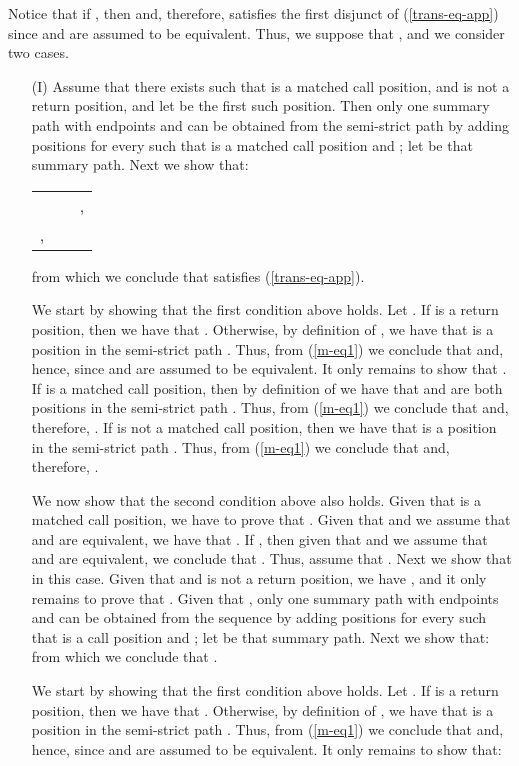 \documentclass{LMCS}
\theoremstyle{plain}
\theoremstyle{definition}
\begin{document}
Notice that if , then  and, therefore,
 satisfies the first disjunct of (\ref{trans-eq-app}) since
 and  are assumed to be equivalent. Thus, we
suppose that , and we consider two cases.
\begin{enumerate}[(a)]
\item[(I)] Assume that there exists  such that 
is a matched call position,  and  is not a
return position, and let  be the first such position. Then only
one summary path with endpoints  and  can be obtained
from the semi-strict path  by adding
positions  for every  such that  is a
matched call position and ; let  be that summary path. Next we show that:
\begin{center}
{\small
\begin{tabular}{l}
 \ \ \ \ \
,\\ 
,
\end{tabular}}
\end{center}
from which we conclude that  satisfies (\ref{trans-eq-app}).

We start by showing that the first condition above holds.  Let . If  is a return position, then we have that . Otherwise, by definition of
, we have that  is a position in the
semi-strict path . Thus, from (\ref{m-eq1}) we
conclude that  and, hence,  since  and  are assumed to
be equivalent. It only remains to show that . If
 is a matched call position, then by definition of  we have
that  and  are both positions in the semi-strict
path . Thus, from (\ref{m-eq1}) we
conclude that  and, therefore, . If  is not a matched call position, then we have
that  is a position in the semi-strict path . Thus, from (\ref{m-eq1}) we conclude that  and, therefore, .  

We now show that the second condition above also holds. Given that
 is a matched call position, we have to prove that . Given that  and we assume that  and  are
equivalent, we have that . If , then given that  and we assume that
 and  are equivalent, we conclude that . Thus, assume that . Next we
show that  in this case. Given that  and  is
not a return position, we have , and it only
remains to prove that . Given that , only one summary
path with endpoints  and  can be obtained from the
sequence  by adding
positions  for every  such that  is a
call position and ; let  be that summary path. Next we show that:
{\small
}\noindent
from which we conclude that .

We start by showing that the first condition above holds.  Let . If  is a return position, then we have that . Otherwise, by definition of , we have that  is a position in the semi-strict
path . Thus, from
(\ref{m-eq1}) we conclude that  and, hence,
 since  and
 are assumed to be equivalent. It only remains to show
that:


\end{enumerate}
\end{document}
